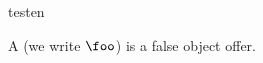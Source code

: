 \begin{modnl}[creators=miko]{test}{en}
\begin{definition}[id=foo.def]
  A  (we write $\foo$) is a false object offer. 
\end{definition}
\end{modnl}
